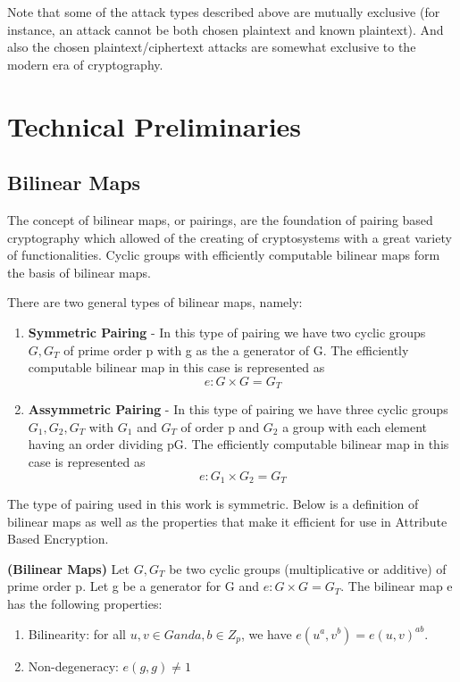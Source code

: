 Note that some of the attack types described above are mutually exclusive (for instance, an attack cannot be both chosen plaintext and known plaintext). And also the chosen plaintext/ciphertext attacks are somewhat exclusive to the modern era of cryptography.

\section{Technical Preliminaries}

\subsection{Bilinear Maps}

The concept of bilinear maps, or pairings, are the foundation of pairing based cryptography which allowed of the creating of cryptosystems with a great variety of functionalities. Cyclic groups with efficiently computable bilinear maps form the basis of bilinear maps.

There are two general types of bilinear maps, namely:

\begin{enumerate}
	\item \textbf{Symmetric Pairing\cite{Lynn2007}} - In this type of pairing we have two cyclic groups $ G, G_{T} $ of prime order p with g as the a generator of G. The efficiently computable bilinear map in this case is represented as $$ e \colon G \times G = G_{T} $$
	
	\item \textbf{Assymmetric Pairing\cite{Lynn2007}} - In this type of pairing we have three cyclic groups $ G_{1}, G_{2}, G_{T} $ with $ G_{1} $ and $ G_{T} $ of order p and $ G_{2} $ a group with each element having an order dividing pG. The efficiently computable bilinear map in this case is represented as $$ e \colon G_{1} \times G_{2} = G_{T} $$
	
\end{enumerate}

The type of pairing used in this work is symmetric. Below is a definition of bilinear maps as well as the properties that make it efficient for use in Attribute Based Encryption.

\begin{definition}{\textbf{(Bilinear Maps\cite{Lynn2007})}}
	Let $ G, G_{T} $  be two cyclic groups (multiplicative or additive) of prime order p. Let g be a generator for G and  $  e \colon G \times G = G_{T} $. The bilinear map e has the following properties:
	
	\begin{enumerate}
		
		\item Bilinearity: for all $ u, v \in G and a, b \in Z_{p} $, we have $ e(u^{a}, v^{b}) = e(u, v)^{ab} $.
		
		\item Non-degeneracy: $ e(g, g) \neq 1 $
		
	\end{enumerate}
	
\end{definition}

